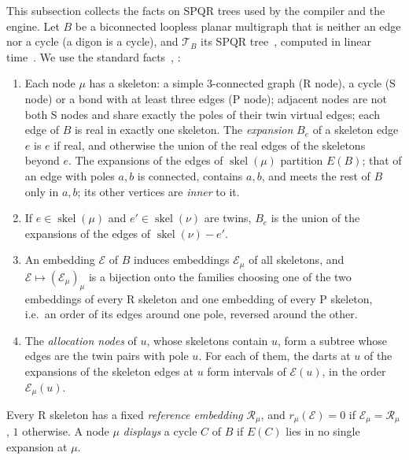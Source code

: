 This subsection collects the facts on SPQR trees used by the compiler and
the engine. Let $B$ be a biconnected loopless planar multigraph that is
neither an edge nor a cycle (a digon is a cycle), and $\mathcal T_B$ its SPQR tree~\cite{DT96},
computed in linear time~\cite{GM01,HT73}. We use the standard
facts~\cite{DT96}, \cite[Section~2.5]{BR16}:
\begin{enumerate}[label=(T\arabic*),nosep]
\item\label{it:v4-T1} Each node $\mu$ has a skeleton: a simple $3$-connected
graph (R node), a cycle (S node) or a bond with at least three edges (P
node); adjacent nodes are not both S nodes and share exactly the poles of
their twin virtual edges; each edge of $B$ is real in exactly one skeleton.
The \emph{expansion} $B_e$ of a skeleton edge $e$ is $e$ if real, and
otherwise the union of the real edges of the skeletons beyond $e$. The
expansions of the edges of $\operatorname{skel}(\mu)$ partition $E(B)$; that
of an edge with poles $a,b$ is connected, contains $a,b$, and meets the rest
of $B$ only in $a,b$; its other vertices are \emph{inner} to it.
\item\label{it:v4-T2} If $e\in\operatorname{skel}(\mu)$ and
$e'\in\operatorname{skel}(\nu)$ are twins, $B_e$ is the union of the
expansions of the edges of $\operatorname{skel}(\nu)-e'$.
\item\label{it:v4-T3} An embedding $\mathcal E$ of $B$ induces embeddings
$\mathcal E_\mu$ of all skeletons, and $\mathcal E\mapsto(\mathcal
E_\mu)_\mu$ is a bijection onto the families choosing one of the two
embeddings of every R skeleton and one embedding of every P skeleton, i.e.\
an order of its edges around one pole, reversed around the other.
\item\label{it:v4-T4} The \emph{allocation nodes} of $u$, whose skeletons
contain $u$, form a subtree whose edges are the twin pairs with pole $u$.
For each of them, the darts at $u$ of the expansions of the skeleton edges
at $u$ form intervals of $\mathcal E(u)$, in the order $\mathcal E_\mu(u)$.
\end{enumerate}
Every R skeleton has a fixed \emph{reference embedding} $\mathcal R_\mu$,
and $r_\mu(\mathcal E)=0$ if $\mathcal E_\mu=\mathcal R_\mu$, $1$
otherwise. A node $\mu$
\emph{displays} a cycle $C$ of $B$ if $E(C)$ lies in no single expansion at
$\mu$.

